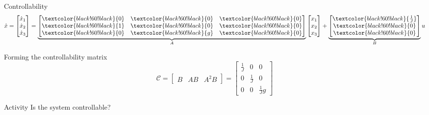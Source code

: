 \documentclass[presentation,aspectratio=169]{beamer}
\begin{document}
\begin{frame}[label={sec:orge0a82e4}]{Controllability}
\[ \dot{x} = \begin{bmatrix} \dot{x}_1\\\dot{x}_2\\\dot{x}_3\end{bmatrix} = \underbrace{\begin{bmatrix} \textcolor{black!60!black}{0} & \textcolor{black!60!black}{0} &\textcolor{black!60!black}{0} \\\textcolor{black!60!black}{1} & \textcolor{black!60!black}{0}& \textcolor{black!60!black}{0}\\ \textcolor{black!60!black}{0}& \textcolor{black!60!black}{g} &\textcolor{black!60!black}{0} \end{bmatrix}}_{A} \begin{bmatrix} x_1\\x_2\\x_3\end{bmatrix} + \underbrace{\begin{bmatrix} \textcolor{black!60!black}{\frac{1}{J}} \\ \textcolor{black!60!black}{0} \\\textcolor{black!60!black}{0}  \end{bmatrix}}_{B} u \]

Forming the controllability matrix
\[ \mathcal{C} = \begin{bmatrix} B & AB & A^2B\end{bmatrix}
   = \begin{bmatrix} \frac{1}{J} & 0 & 0\\0 & \frac{1}{J} & 0 \\0 & 0 & \frac{1}{J}g \end{bmatrix} \]

\pause
\alert{Activity} Is the system controllable?
\end{frame}
\end{document}
